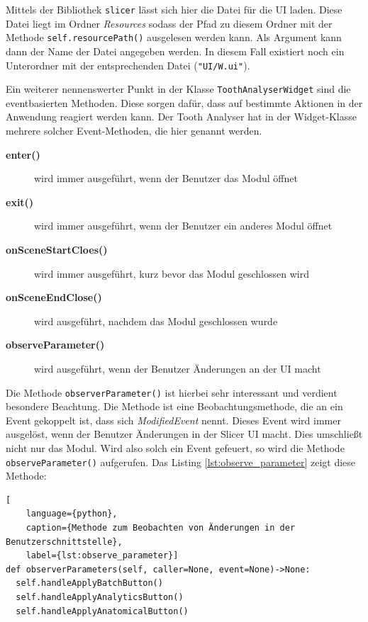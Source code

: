 Mittels der Bibliothek \texttt{slicer} lässt sich hier die Datei für die \ac{UI}
laden. Diese Datei liegt im Ordner \textit{Resources} sodass der Pfad zu diesem
Ordner mit der Methode \texttt{self.resourcePath()} ausgelesen werden kann. Als
Argument kann dann der Name der Datei angegeben werden. In diesem Fall existiert
noch ein Unterordner mit der entsprechenden Datei (\texttt{"UI/W.ui"}).

Ein weiterer nennenswerter Punkt in der Klasse \texttt{ToothAnalyserWidget} sind
die eventbasierten Methoden. Diese sorgen dafür, dass auf bestimmte Aktionen in der
Anwendung reagiert werden kann. Der Tooth Analyser hat in der Widget-Klasse
mehrere solcher Event-Methoden, die hier genannt werden.

\begin{description}
	\item[\textbf{enter()}] wird immer ausgeführt, wenn der Benutzer das Modul
		öffnet

	\item[\textbf{exit()}] wird immer ausgeführt, wenn der Benutzer ein anderes
		Modul öffnet

	\item[\textbf{onSceneStartCloes()}] wird immer ausgeführt, kurz bevor das
		Modul geschlossen wird

	\item[\textbf{onSceneEndClose()}] wird ausgeführt, nachdem das Modul
		geschlossen wurde

	\item[\textbf{observeParameter()}] wird ausgeführt, wenn der Benutzer
		Änderungen an der \ac{UI} macht
\end{description}

Die Methode \texttt{observerParameter()} ist hierbei sehr interessant und verdient
besondere Beachtung. Die Methode ist eine Beobachtungsmethode, die an ein Event gekoppelt
ist, dass sich \textit{ModifiedEvent} nennt. Dieses Event wird immer ausgelöst, wenn
der Benutzer Änderungen in der Slicer \ac{UI} macht. Dies umschließt nicht nur das
Modul. Wird also solch ein Event gefeuert, so wird die Methode \texttt{observeParameter()}
aufgerufen. Das Listing \ref{lst:observe_parameter} zeigt diese Methode:

\begin{lstlisting}[
    language={python},
    caption={Methode zum Beobachten von Änderungen in der Benutzerschnittstelle},
    label={lst:observe_parameter}]
def observerParameters(self, caller=None, event=None)->None:
  self.handleApplyBatchButton()
  self.handleApplyAnalyticsButton()
  self.handleApplyAnatomicalButton()
\end{lstlisting}

